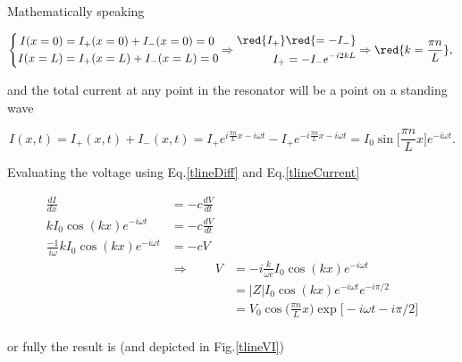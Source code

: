 Mathematically speaking

 \begin{equation}
   \left\lbrace \begin{aligned}
       I(x=0) & = I_{+}(x=0)+I_-(x=0)=0\\
       I(x=L) & = I_{+}(x=L)+I_-(x=L)=0
     \end{aligned}\Rightarrow\begin{aligned}
       \red{I_+}&\red{=-I_-}\\
       I_+&= -I_-e^{-i2kL}
     \end{aligned} \Rightarrow \red{k=\frac{\pi n}{L}}, \right.
 \end{equation}

 \noindent and the  total current at any point in  the resonator will
 be a point on a standing wave

 \begin{equation}
   I(x,t) = I_+(x,t) + I_-(x,t) = I_+e^{i\frac{\pi n}{L}x-i\omega t} - I_+e^{-i\frac{\pi n}{L}x-i\omega t} = {{I_0\sin\bigg[\frac{\pi n}{L}x\bigg]e^{-i\omega t}}}.
   \label{tlineCurrent}
 \end{equation}

 \noindent  Evaluating  the  voltage using  Eq.\eqref{tlineDiff}  and
 Eq.\eqref{tlineCurrent}

 \begin{equation}
   \begin{aligned}
     \frac{dI}{dx} &= - c\frac{dV}{dt}\\
     kI_0\cos(kx)e^{-i\omega t}& =-c\frac{dV}{dt}\\
     \frac{-1}{i\omega}kI_0\cos(kx)e^{-i\omega t}& =-cV\\
     & \Rightarrow\qquad V &=  -i\frac{k}{\omega c}I_0\cos(kx)e^{-i\omega t}\\
     &&=|Z|I_0\cos(kx)e^{-i\omega t}e^{-i\pi/2}\\
     &&=V_0\cos \bigg(\frac{\pi n}{L}x\bigg)\exp\bigg[-i\omega t-i\pi/2\bigg]\\
   \end{aligned}
 \end{equation}

 \noindent or fully the result is (and depicted in Fig.\ref{tlineVI})


